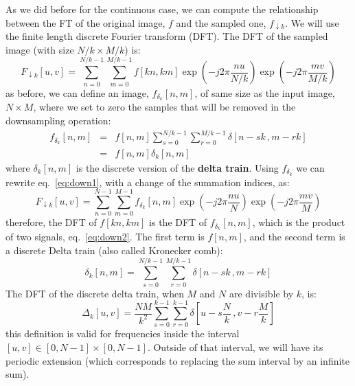 As we did before for the continuous case, we can compute the relationship between the FT of the original image, $f$ and the sampled one, $f_{\downarrow k}$. We will use the finite length discrete Fourier transform (DFT). The DFT of the sampled image (with size $N/k \times M/k$) is:
\begin{equation}
  F_{\downarrow k} \left[u,v\right]   = \sum_{n=0}^{N/k-1} \sum_{m=0}^{M/k-1} f\left[kn,km\right] \exp{ \left(  -j2\pi \frac{nu}{N/k} \right)}  \exp{ \left(  -j2\pi \frac{mv}{M/k} \right)}
  \label{eq:down1}
\end{equation}
as before, we can define an image, $f_{\delta_k} \left[n,m\right]$, of same size as the input image, $N \times M$, where we set to zero the samples that will be removed in the downsampling operation:
\begin{eqnarray}
  f_{\delta_k} \left[n,m\right] &=& f\left[n,m\right] \sum_{s=0}^{N/k-1} \sum_{r=0}^{M/k-1} \delta \left[n - sk \, ,m - rk \right] \\
  &=&  f\left[n,m\right]  \delta_k \left[n,m\right]
  \label{eq:down2}
\end{eqnarray}
where $\delta_k \left[n,m\right]$ is the discrete version of the {\bf delta train}. Using $f_{\delta_k}$ we can rewrite eq.~\ref{eq:down1}, with a change of the summation indices, as:
\begin{equation}
  F_{\downarrow k} \left[u,v\right]   = \sum_{n=0}^{N-1} \sum_{m=0}^{M-1} f_{\delta_k} \left[n,m\right] \exp{ \left(  -j2\pi \frac{nu}{N} \right)}  \exp{ \left(  -j2\pi \frac{mv}{M} \right)}
\end{equation}
therefore, the DFT of $f\left[kn,km\right]$ is the DFT of $f_{\delta_k} \left[n,m\right]$, which is the product of two signals, eq.~\ref{eq:down2}. The first term is $f\left[n,m\right]$, and the second term is a discrete Delta train (also called Kronecker comb):
\begin{equation}
  \delta_k \left[n,m\right]  =  \sum_{s=0}^{N/k-1} \sum_{r=0}^{M/k-1} \delta \left[n - sk \, ,m - rk \right]
\end{equation}
The DFT of the discrete delta train, when $M$ and $N$ are divisible by $k$, is:
\begin{equation}
  \Delta_k \left[u,v\right]  = \frac{NM}{k^2}  \sum_{s=0}^{k-1} \sum_{r=0}^{k-1} \delta \left[u - s\frac{N}{k} \, ,v - r\frac{M}{k} \right]
\end{equation}
this definition is valid for frequencies inside the interval $[u,v] \in [0,N-1]\times[0,N-1]$. Outside of that interval, we will have its periodic extension (which corresponds to replacing the sum interval by an infinite sum).

